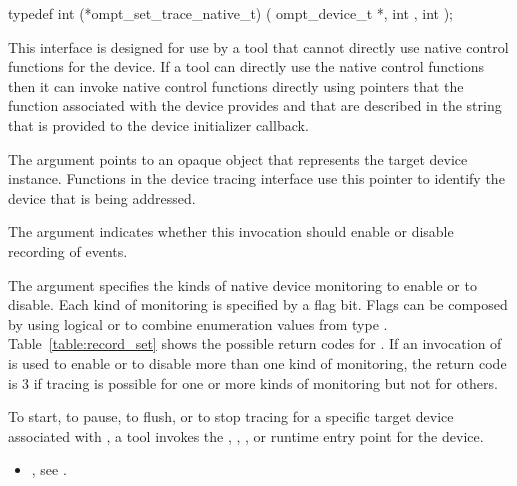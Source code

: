 \format
\begin{ccppspecific}
\begin{omptInquiry}
typedef int (*ompt_set_trace_native_t) (
  ompt_device_t *,
  int ,
  int 
);
\end{omptInquiry}
\end{ccppspecific}

\descr
This interface is designed for use by a tool that cannot directly use 
native control functions for the device. If a tool can directly use the
native control functions then it can invoke native control functions
directly using pointers that the  function associated with 
the device provides and that are described in the 
string that is provided to the device initializer callback.

\argdesc
The  argument points to an opaque object that represents
the target device instance. Functions in the device tracing interface
use this pointer to identify the device that is being addressed.

The  argument indicates whether this invocation should 
enable or disable recording of events.

The  argument specifies the kinds of native device monitoring 
to enable or to disable. Each kind of monitoring is specified by a flag bit.
Flags can be composed by using logical {\ttfamily or}  to combine enumeration
values from type . Table~\ref{table:record_set} 
shows the possible return codes for . If an 
invocation of  is used to enable or to disable 
more than one kind of monitoring, the return code is 3 if tracing is possible 
for one or more kinds of monitoring but not for others.

To start, to pause, to flush, or to stop tracing for a specific target device
associated with , a tool invokes the , 
, , or  
runtime entry point for the device.

\crossreferences
\begin{itemize}
\item {}, see .
\end{itemize}



\label{sec:ompt_start_trace_t}

